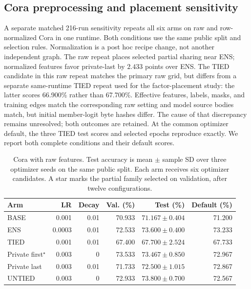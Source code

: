 \subsection{Cora preprocessing and placement sensitivity}\label{app:cora-preprocessing}
A separate matched 216-run sensitivity repeats all six arms on raw and
row-normalized Cora in one runtime. Both conditions use the same public
split and selection rules. Normalization is a post hoc recipe change,
not another independent graph. The raw repeat places selected partial
sharing near ENS; normalized features favor private-last by $2.433$
points over ENS. The TIED candidate in this raw repeat matches the primary raw grid,
but differs from a separate same-runtime TIED repeat used for the
factor-placement study: the latter scores 66.900\% rather than 67.700\%. Effective features, labels,
masks, and training edges match the corresponding raw setting and model
source bodies match, but initial member-logit byte hashes differ. The
cause of that discrepancy remains unresolved; both outcomes are retained. At the common optimizer default, the
three TIED test scores and selected epochs reproduce exactly. We report both complete
conditions and their default scores.

\begin{table}[t]
\centering\small
\caption{Cora with raw features. Test accuracy is mean $\pm$ sample SD over three optimizer seeds on the same public split. Each arm receives six optimizer candidates. A star marks the partial family selected on validation, after twelve configurations.}
\label{tab:cora-raw}
\setlength{\tabcolsep}{4pt}
\begin{tabular}{lrrrrr}
\toprule
Arm & LR & Decay & Val. (\%) & Test (\%) & Default (\%)\\
\midrule
BASE & 0.001 & 0.01 & 70.933 & $71.167 \pm 0.404$ & 71.200\\
ENS & 0.0003 & 0.01 & 72.533 & $73.600 \pm 0.400$ & 73.233\\
TIED & 0.001 & 0.01 & 67.400 & $67.700 \pm 2.524$ & 67.733\\
Private first$^{\star}$ & 0.003 & 0 & 73.533 & $73.467 \pm 0.850$ & 72.967\\
Private last & 0.003 & 0.01 & 71.733 & $72.500 \pm 1.015$ & 72.867\\
UNTIED & 0.003 & 0 & 72.933 & $73.800 \pm 0.700$ & 72.567\\
\bottomrule
\end{tabular}
\end{table}

